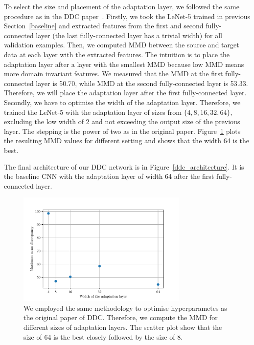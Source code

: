 To select the size and placement of the adaptation layer,
we followed the same procedure as in the DDC paper~\cite{tzeng2014}.
Firstly, we took the LeNet-5 trained in previous Section~\ref{baseline}
and extracted features from the first and second fully-connected layer
(the last fully-connected layer has a trivial width)
for all validation examples.
Then, we computed MMD between the source and target data at each layer with the extracted features.
The intuition is to place the adaptation layer after a layer with the smallest MMD
because low MMD means more domain invariant features.
We measured that the MMD at the first fully-connected layer is 50.70,
while MMD at the second fully-connected layer is 53.33.
Therefore, we will place the adaptation layer after the first fully-connected layer.
Secondly, we have to optimise the width of the adaptation layer.
Therefore, we trained the LeNet-5 with the adaptation layer of sizes
from \(\{4, 8, 16, 32, 64\}\), excluding the low width of 2
and not exceeding the output size of the previous layer.
The stepping is the power of two as in the original paper.
Figure~\ref{adaptation_layer} plots the resulting MMD values for different setting
and shows that the width 64 is the best.

The final architecture of our DDC network is in Figure~\ref{ddc_architecture}.
It is the baseline CNN with the adaptation layer of width 64
after the first fully-connected layer.

\begin{figure}
\begin{center}
\includegraphics[width=0.75\textwidth]{img/adaptation_layer_width.pdf}
\end{center}
\caption[Optimisation of the width of the adaptation layer]{
	We employed the same methodology to optimise hyperparametes as the original paper of DDC.
	Therefore, we compute the MMD for different sizes of adaptation layers.
	The scatter plot show that the size of 64 is the best closely followed by the size of 8.
}
\label{adaptation_layer}
\end{figure}

